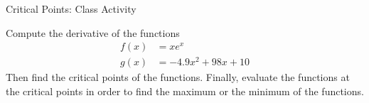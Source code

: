 \documentclass[../tufte-style.tex]{standalone}
\begin{document}
\date{March 3, 2026}


\begin{frame}{Critical Points: Class Activity}

    Compute the derivative of the functions
    \begin{align*}
        f(x) &= xe^{x} \\
        g(x) &= -4.9 x^2 + 98x + 10 
    \end{align*}
    Then find the critical points of the functions.
    Finally, evaluate the functions at the critical points in order to find the maximum or the minimum of the functions.

\end{frame}
\end{document}
